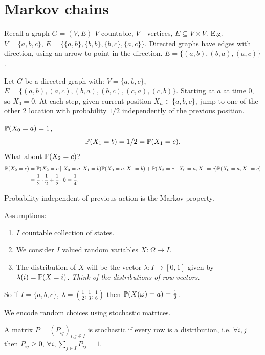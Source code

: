 \documentclass[10pt, a4paper]{article}
\begin{document}
\newpage

\section{Markov chains}
Recall a graph $G = (V, E)$ $V$ countable,
$V$ -
vertices,
$E \subseteq V \times V$.
E.g.
$V = \{a, b, c\}$,
$E = \{\{a, b\}, \{b, b\}, \{b, c\}, \{a, c\}\}$.
Directed graphs have edges with direction,
using an arrow to point in the direction.
$E = \{(a, b), (b, a), (a, c)\}$.

\begin{example}
    Let $G$ be a directed graph with:
    $V = \{a, b, c\}$,
    $E = \{(a, b), (a, c), (b, a), (b, c), (c, a), (c, b)\}$.
    Starting at $a$ at time $0$,
    so $X_0 = 0$.
    At each step,
    given current position $X_n \in \{a, b, c\}$,
    jump to one of the other $2$ location with probability $1 / 2$ independently of the previous position.

    $\P(X_0 = a) = 1$,
    \[
    \P(X_1 = b) = 1 / 2 = \P(X_1 = c).
    \]
    What about $\P(X_2 = c)$?
    \begin{align*}
        \P(X_2 = c) &= \P(X_2 = c \mid X_0 = a, X_1 = b)\P(X_0 = a, X_1 = b) + \P(X_2 = c \mid X_0 = a, X_1 = c)\P(X_0 = a, X_1 = c) \\
        &= \frac{1}{2}\cdot\frac{1}{2} + \frac{1}{2}\cdot 0 = \frac{1}{4}.
    \end{align*}
\end{example}
Probability independent of previous action is the Markov property.

Assumptions:
\begin{enumerate}[label = (\arabic*)]
    \item $I$ countable collection of states.

    \item We consider $I$ valued random variables $X : \Omega \to I$.

    \item The distribution of $X$ will be the vector $\lambda : I \to [0, 1]$ given by $\lambda(i) = \P(X = i)$.
    \textit{Think of the distributions of row vectors.}
\end{enumerate}
So if $I = \{a, b, c\}$,
$\lambda = \left(\frac{1}{2}, \frac{1}{3}, \frac{1}{6}\right)$ then $\P(X(\omega) = a) = \frac{1}{2}$.

We encode random choices using stochastic matrices.
\begin{definition}
    A matrix $P = (P_{ij})_{i, j \in I}$ is stochastic if every row is a distribution,
    i.e. $\forall i, j$ then $P_{ij} \geq 0$,
    $\forall i, \sum_{j \in I}P_{ij} = 1$.
\end{definition}
\end{document}
